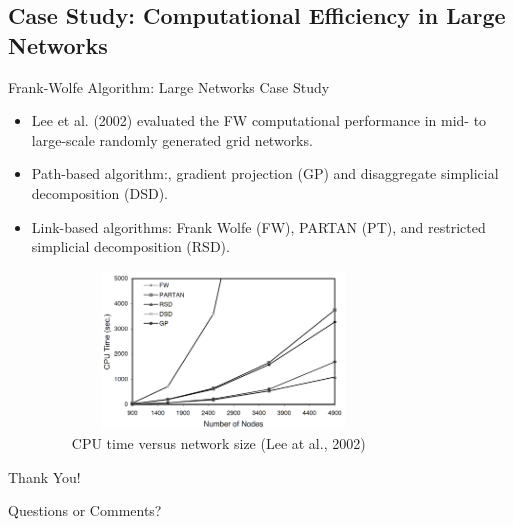 \documentclass{beamer}
\begin{document}
\subsection{Case Study: Computational Efficiency in Large Networks}
\begin{frame}{Frank-Wolfe Algorithm: Large Networks Case Study}
\begin{itemize}
	\item  Lee et al. (2002) evaluated the FW computational performance in mid- to large-scale randomly generated grid networks.
	\item Path-based algorithm:, gradient projection (GP) and disaggregate simplicial decomposition (DSD).
	\item Link-based algorithms: Frank Wolfe (FW), PARTAN (PT), and restricted simplicial decomposition (RSD).
	\begin{figure}
		\includegraphics[width=8cm, height=4.2cm]{Fig/ComputationalTime.png}
		\caption{CPU time versus network size (Lee at al., 2002)}
	\end{figure}
\end{itemize}

\end{frame}	
	\begin{frame}{}
		\Huge{\centerline{Thank You!}}
		\vspace{5mm}
		\small\centerline{Questions or Comments?}
	\end{frame}
\end{document}
